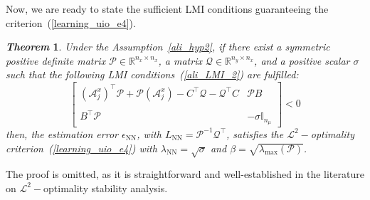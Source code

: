 \documentclass{ifacconf}
\def\eqref#1{(\ref{#1})}
\def\nn{\mathrm{NN}}
\def\Lo{L}
\newtheorem{theorem}{\it \textbf{Theorem}}%
\begin{document}
Now, we are ready to state the sufficient LMI conditions guaranteeing the criterion~\eqref{learning_uio_e4}.

\begin{theorem}\label{ali_thm2}
Under the Assumption~\ref{ali_hyp2}, if there exist a symmetric positive definite matrix $\mathcal{P} \in \mathbb{R}^{n_{x}\times n_{x}}$, a matrix $\mathcal{Q} \in \mathbb{R}^{n_{y}\times n_{x}}$, and a positive scalar $\sigma$ such that the following LMI conditions~\eqref{ali_LMI_2} are fulfilled:
\begin{equation}\label{ali_LMI_2}
\begin{bmatrix}
\left(\mathcal{A}^{x}_{j}\right)^{\top} \mathcal{P} + \mathcal{P} \left( \mathcal{A}^{x}_{j} \right)  - C^{\top} \mathcal{Q}  - \mathcal{Q}^{\top}  C
&
\mathcal{P} B
\\~\\
B^{\top} \mathcal{P} &
- \sigma \mathbb{I}_{n_{\mu}}
\end{bmatrix} 
< 0
\end{equation}
then, the estimation error $\epsilon_{\nn}$, with $\Lo_{\nn} = \mathcal{P}^{-1} \mathcal{Q}^{\top}$, satisfies the $\mathcal{L}^{2}-$optimality criterion~\eqref{learning_uio_e4} with $\lambda_{\nn}=\sqrt{\sigma}$ and $\beta = \sqrt{\lambda_{\max} (\mathcal{P})}$.
\end{theorem}
\begin{pf}
The proof is omitted, as it is straightforward and well-established in the literature on $\mathcal{L}^{2}-$optimality stability analysis.
\end{pf}



\vspace*{-0.3cm}
\end{document}
